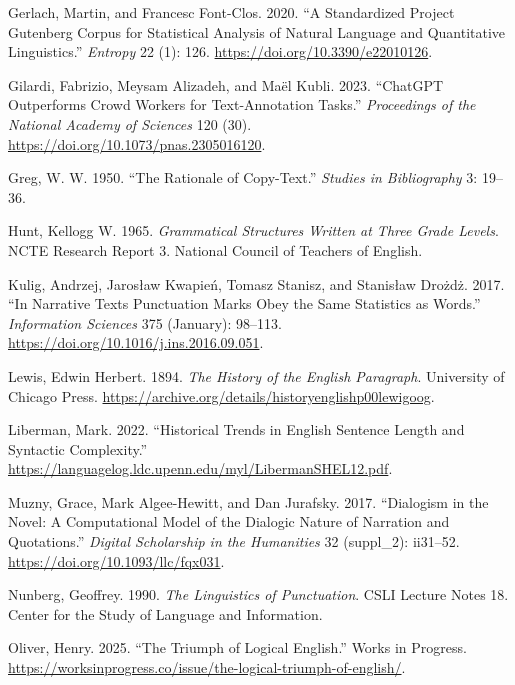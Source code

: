 \documentclass[
  11pt,
]{article}
\newlength{\cslhangindent}
\newenvironment{CSLReferences}[2] %
 {\begin{list}{}{%
  \setlength{\itemindent}{0pt}
  \setlength{\leftmargin}{0pt}
  \setlength{\parsep}{0pt}
  \ifodd #1
   \setlength{\leftmargin}{\cslhangindent}
   \setlength{\itemindent}{-1\cslhangindent}
  \fi
  \setlength{\itemsep}{#2\baselineskip}}}
 {\end{list}}
\begin{document}
\begin{CSLReferences}{1}{1}
Gerlach, Martin, and Francesc Font-Clos. 2020. {``A Standardized Project Gutenberg Corpus for Statistical Analysis of Natural Language and Quantitative Linguistics.''} \emph{Entropy} 22 (1): 126.
\url{https://doi.org/10.3390/e22010126}.

Gilardi, Fabrizio, Meysam Alizadeh, and Maël Kubli. 2023. {``ChatGPT Outperforms Crowd Workers for Text-Annotation Tasks.''} \emph{Proceedings of the National Academy of Sciences} 120 (30).
\url{https://doi.org/10.1073/pnas.2305016120}.

Greg, W. W. 1950. {``The Rationale of Copy-Text.''} \emph{Studies in Bibliography} 3: 19--36.

Hunt, Kellogg W. 1965. \emph{Grammatical Structures Written at Three Grade Levels}. NCTE Research Report 3. National Council of Teachers of English.

Kulig, Andrzej, Jarosław Kwapień, Tomasz Stanisz, and Stanisław Drożdż. 2017. {``In Narrative Texts Punctuation Marks Obey the Same Statistics as Words.''} \emph{Information Sciences} 375 (January):
98--113. \url{https://doi.org/10.1016/j.ins.2016.09.051}.

Lewis, Edwin Herbert. 1894. \emph{The History of the English Paragraph}. University of Chicago Press. \url{https://archive.org/details/historyenglishp00lewigoog}.

Liberman, Mark. 2022. {``Historical Trends in English Sentence Length and Syntactic Complexity.''} \url{https://languagelog.ldc.upenn.edu/myl/LibermanSHEL12.pdf}.

Muzny, Grace, Mark Algee-Hewitt, and Dan Jurafsky. 2017. {``Dialogism in the Novel: A Computational Model of the Dialogic Nature of Narration and Quotations.''} \emph{Digital Scholarship in the
Humanities} 32 (suppl\_2): ii31--52. \url{https://doi.org/10.1093/llc/fqx031}.

Nunberg, Geoffrey. 1990. \emph{The Linguistics of Punctuation}. CSLI Lecture Notes 18. {Center for the Study of Language and Information}.

Oliver, Henry. 2025. {``The Triumph of Logical English.''} Works in Progress. \url{https://worksinprogress.co/issue/the-logical-triumph-of-english/}.


\end{CSLReferences}
\end{document}
